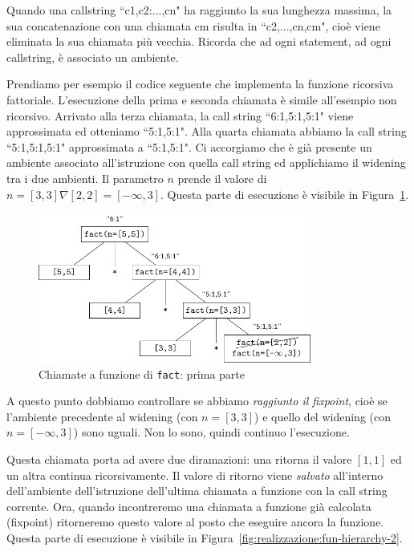 Quando una callstring \textsf{``c1,c2:...,cn"} ha raggiunto la sua lunghezza massima, la sua concatenazione con una chiamata \textsf{cm} risulta in \textsf{``c2,...,cn,cm"}, cioè viene eliminata la sua chiamata più vecchia. Ricorda che ad ogni statement, ad ogni callstring, è associato un ambiente.

Prendiamo per esempio il codice seguente che implementa la funzione ricorsiva fattoriale. L'esecuzione della prima e seconda chiamata è simile all'esempio non ricorsivo. Arrivato alla terza chiamata, la call string \textsf{``6:1,5:1,5:1"} viene approssimata ed otteniamo \textsf{``5:1,5:1"}. Alla quarta chiamata abbiamo la call string \textsf{``5:1,5:1,5:1"} approssimata a \textsf{``5:1,5:1"}. Ci accorgiamo che è già presente un ambiente associato all'istruzione con quella call string ed applichiamo il widening tra i due ambienti. Il parametro $n$ prende il valore di $n = [3,3] \nabla [2,2] = [-\infty,3]$. Questa parte di esecuzione è visibile in Figura~\ref{fig:realizzazione:fun-hierarchy-1}.

\begin{figure}[htbp]
    \centering
    \includegraphics[width=0.8\textwidth]{scheme-generator/generated/example-fun-rec-hierarchy-1.pdf}
    \caption{Chiamate a funzione di \texttt{fact}: prima parte}
    \label{fig:realizzazione:fun-hierarchy-1}
\end{figure}

A questo punto dobbiamo controllare se abbiamo \emph{raggiunto il fixpoint}, cioè se l'ambiente precedente al widening (con $n=[3,3]$) e quello del widening (con $n = [-\infty, 3]$) sono uguali. Non lo sono, quindi continuo l'esecuzione.

Questa chiamata porta ad avere due diramazioni: una ritorna il valore $[1,1]$ ed un altra continua ricorsivamente. Il valore di ritorno viene \emph{salvato} all'interno dell'ambiente dell'istruzione dell'ultima chiamata a funzione con la call string corrente. Ora, quando incontreremo una chiamata a funzione già calcolata (fixpoint) ritorneremo questo valore al posto che eseguire ancora la funzione. Questa parte di esecuzione è visibile in Figura~\ref{fig:realizzazione:fun-hierarchy-2}.

